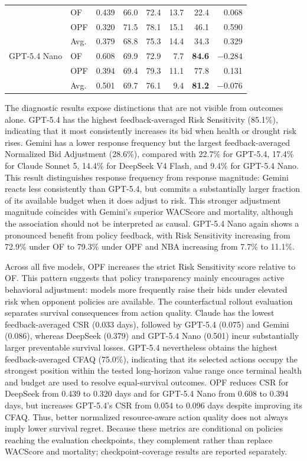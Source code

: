 \documentclass[letterpaper]{article} %
\begin{document}
\begin{table}[t]
\begin{tabular}{llrrrrrr}
            & OF  & 0.439 & 66.0 & 72.4 & 13.7 & 22.4 & 0.068 \\
            & OPF & 0.320 & 71.5 & 78.1 & 15.1 & 46.1 & 0.590 \\
            & Avg. & 0.379 & 68.8 & 75.3 & 14.4 & 34.3 & 0.329 \\
        \addlinespace
        GPT-5.4 Nano
            & OF  & 0.608 & 69.9 & 72.9 & 7.7 & \textbf{84.6} & $-0.284$ \\
            & OPF & 0.394 & 69.4 & 79.3 & 11.1 & 77.8 & 0.131 \\
            & Avg. & 0.501 & 69.7 & 76.1 & 9.4 & \textbf{81.2} & $-0.076$ \\
        \bottomrule
    \end{tabular}
\end{table}

The diagnostic results expose distinctions that are not visible from
outcomes alone. GPT-5.4 has the highest feedback-averaged Risk
Sensitivity (85.1\%), indicating that it most consistently increases
its bid when health or drought risk rises. Gemini has a lower response
frequency but the largest feedback-averaged Normalized Bid Adjustment
(28.6\%), compared with 22.7\% for GPT-5.4, 17.4\% for Claude Sonnet 5,
14.4\% for DeepSeek V4 Flash, and 9.4\% for GPT-5.4 Nano. This result
distinguishes response frequency from response magnitude: Gemini reacts
less consistently than GPT-5.4, but commits a substantially larger
fraction of its available budget when it does adjust to risk. This
stronger adjustment magnitude coincides with Gemini's superior WACScore
and mortality, although the association should not be interpreted as
causal. GPT-5.4 Nano again shows a pronounced benefit from policy
feedback, with Risk Sensitivity increasing from 72.9\% under OF to
79.3\% under OPF and NBA increasing from 7.7\% to 11.1\%.

Across all five models, OPF increases the strict Risk Sensitivity score
relative to OF. This pattern suggests that policy transparency mainly
encourages active behavioral adjustment: models more frequently raise
their bids under elevated risk when opponent policies are available.
The counterfactual rollout evaluation separates survival consequences
from action quality. Claude has the lowest feedback-averaged CSR
(0.033 days), followed by GPT-5.4 (0.075) and Gemini (0.086), whereas
DeepSeek (0.379) and GPT-5.4 Nano (0.501) incur substantially larger
preventable survival losses. GPT-5.4 nevertheless obtains the highest
feedback-averaged CFAQ (75.0\%), indicating that its selected actions
occupy the strongest position within the tested long-horizon value
range once terminal health and budget are used to resolve equal-survival
outcomes. OPF reduces CSR for DeepSeek from 0.439 to 0.320 days and for
GPT-5.4 Nano from 0.608 to 0.394 days, but increases GPT-5.4's CSR from
0.054 to 0.096 days despite improving its CFAQ. Thus, better normalized
resource-aware action quality does not always imply lower survival
regret. Because these metrics are conditional on policies reaching the
evaluation checkpoints, they complement rather than replace WACScore
and mortality; checkpoint-coverage results are reported separately.
\end{document}
